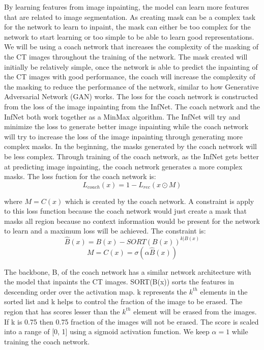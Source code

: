 By learning features from image inpainting, the model can learn more features that are related to image segmentation. As creating mask can be a complex task for the network to learn to inpaint, the mask can either be too complex for the network to start learning or too simple to be able to learn good representations. We will be using a coach network that increases the complexity of the masking of the CT images throughout the training of the network. The mask created will initially be relatively simple, once the network is able to predict the inpainting of the CT images with good performance, the coach will increase the complexity of the masking to reduce the performance of the network, similar to how Generative Adversarial Network (GAN) works. The loss for the coach network is constructed from the loss of the image inpainting from the InfNet. The coach network and the InfNet both work together as a MinMax algorithm. The InfNet will try and minimize the loss to generate better image inpainting while the coach network will try to increase the loss of the image inpainting through generating more complex masks. In the beginning, the masks generated by the coach network will be less complex. Through training of the coach network, as the InfNet gets better at predicting image inpainting, the coach network generates a more complex masks. The loss fuction for the coach network is:
\begin{equation}
L_{coach}(x) = 1 - L_{rec}(x\odot M)
\end{equation}

where $M = C(x)$ which is created by the coach network. A constraint is apply to this loss function because the coach network would just create a mask that masks all region because no context information would be present for the network to learn and a maximum loss will be achieved. The constraint is:
\begin{equation}
\hat{B}(x) = B(x) - SORT(B(x))^{k|B(x)} 
\end{equation}
\begin{equation}
M = C(x) = \sigma (\alpha \hat{B}(x))
\end{equation}

The backbone, B, of the coach network has a similar network architecture with the model that inpaints the CT images. SORT(B(x)) sorts the features in descending order over the activation map. k represents the $k^{th}$ elements in the sorted list and k helps to control the fraction of the image to be erased. The region that has scores lesser than the $k^{th}$ element will be erased from the images. If k is 0.75 then 0.75 fraction of the images will not be erased. The score is scaled into a range of [0, 1] using a sigmoid activation function. We keep $\alpha = 1$ while training the coach network.

